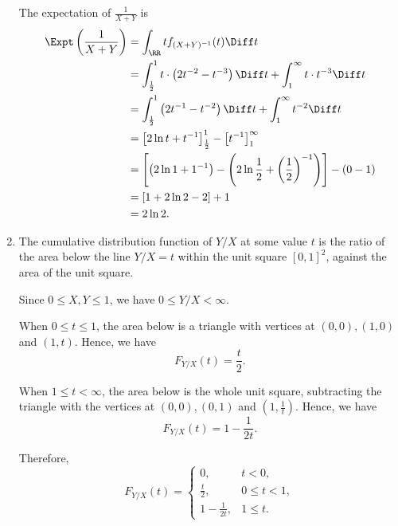 \begin{enumerate}
          The expectation of \(\frac{1}{X + Y}\) is
          \begin{align*}
              \Expt\left(\frac{1}{X + Y}\right) & = \int_{\RR} t f_{(X + Y)^{-1}}(t) \Diff t                                                                              \\
                                                & = \int_{\frac{1}{2}}^{1} t \cdot \left(2t^{-2} - t^{-3}\right) \Diff t + \int_{1}^{\infty} t \cdot t^{-3} \Diff t       \\
                                                & = \int_{\frac{1}{2}}^{1} \left(2t^{-1} - t^{-2}\right) \Diff t + \int_{1}^{\infty} t^{-2} \Diff t                       \\
                                                & = \left[2 \ln t + t^{-1}\right]_{\frac{1}{2}}^{1} - \left[t^{-1}\right]_{1}^{\infty}                                    \\
                                                & = \left[\left(2 \ln 1 + 1^{-1}\right) - \left(2 \ln \frac{1}{2} + \left(\frac{1}{2}\right)^{-1}\right)\right] - (0 - 1) \\
                                                & = \left[1 + 2 \ln 2 - 2\right] + 1                                                                                      \\
                                                & = 2 \ln 2.
          \end{align*}

    \item The cumulative distribution function of \(Y / X\) at some value \(t\) is the ratio of the area below the line \(Y / X = t\) within the unit square \([0, 1]^2\), against the area of the unit square.

          Since \(0 \leq X, Y \leq 1\), we have \(0 \leq Y / X < \infty\).

          When \(0 \leq t \leq 1\), the area below is a triangle with vertices at \((0, 0), (1, 0)\) and \((1, t)\). Hence, we have
          \[
              F_{Y / X} (t) = \frac{t}{2}.
          \]

          When \(1 \leq t < \infty\), the area below is the whole unit square, subtracting the triangle with the vertices at \((0, 0), (0, 1)\) and \(\left(1, \frac{1}{t}\right)\). Hence, we have
          \[
              F_{Y / X} (t) = 1 - \frac{1}{2t}.
          \]

          Therefore,
          \[
              F_{Y / X} (t) = \begin{cases}
                  0,                & t < 0,        \\
                  \frac{t}{2},      & 0 \leq t < 1, \\
                  1 - \frac{1}{2t}, & 1 \leq t.
              \end{cases}
          \]


\end{enumerate}
